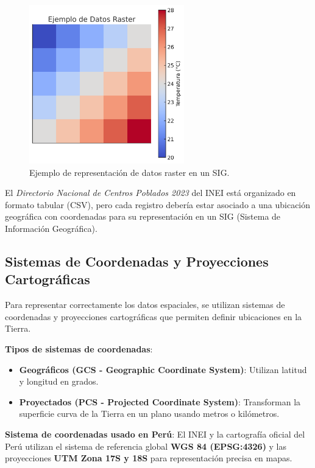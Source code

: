 \documentclass{article}
\begin{document}
\begin{itemize}
	\begin{figure}[ht]
		\centering
		\includegraphics[width=0.6\textwidth]{ras1.png}
		\caption{Ejemplo de representación de datos raster en un SIG.}
	\end{figure}
	
	
	
	
	El \textit{Directorio Nacional de Centros Poblados 2023} del INEI está organizado en formato tabular (CSV), pero cada registro debería estar asociado a una ubicación geográfica con coordenadas para su representación en un SIG (Sistema de Información Geográfica).
	
	\subsection*{Sistemas de Coordenadas y Proyecciones Cartográficas}
	Para representar correctamente los datos espaciales, se utilizan sistemas de coordenadas y proyecciones cartográficas que permiten definir ubicaciones en la Tierra.
	
	\textbf{Tipos de sistemas de coordenadas}:
	\begin{itemize}
		\item \textbf{Geográficos (GCS - Geographic Coordinate System)}: Utilizan latitud y longitud en grados.
		\item \textbf{Proyectados (PCS - Projected Coordinate System)}: Transforman la superficie curva de la Tierra en un plano usando metros o kilómetros.
	\end{itemize}
	
	\textbf{Sistema de coordenadas usado en Perú}:  
	El INEI y la cartografía oficial del Perú utilizan el sistema de referencia global \textbf{WGS 84 (EPSG:4326)} y las proyecciones \textbf{UTM Zona 17S y 18S} para representación precisa en mapas.
	

\end{itemize}
\end{document}
